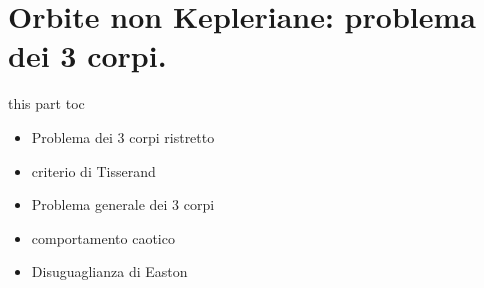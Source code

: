 \documentclass[10pt,xcolor={usenames},fleqn,mathserif,serif]{beamer}
\begin{document}



\part{Orbite non Kepleriane: problema dei 3 corpi.}\label{part:threebody}
\frame{\partpage}

\begin{frame}{this part toc}

\begin{itemize}

\item Problema dei 3 corpi ristretto

\item criterio di Tisserand

\item Problema generale dei 3 corpi

\item comportamento caotico

\item Disuguaglianza di Easton

\end{itemize}


\end{frame}



\end{document}
